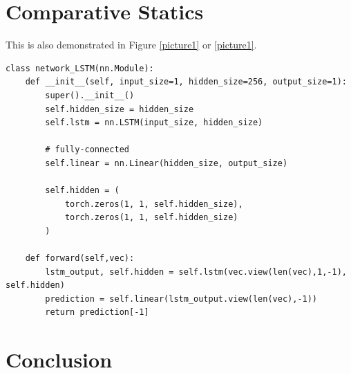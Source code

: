 \section{Comparative Statics}
This is also demonstrated in Figure \ref{picture1} or \cref{picture1}.

\begin{lstlisting}[style=python_code, caption={Long short-term memory}, label=mypythoncode]
class network_LSTM(nn.Module):
    def __init__(self, input_size=1, hidden_size=256, output_size=1):
        super().__init__()
        self.hidden_size = hidden_size
        self.lstm = nn.LSTM(input_size, hidden_size)

        # fully-connected
        self.linear = nn.Linear(hidden_size, output_size)

        self.hidden = (
            torch.zeros(1, 1, self.hidden_size),
            torch.zeros(1, 1, self.hidden_size)
        )

    def forward(self,vec):
        lstm_output, self.hidden = self.lstm(vec.view(len(vec),1,-1), self.hidden)
        prediction = self.linear(lstm_output.view(len(vec),-1))
        return prediction[-1]
\end{lstlisting}

\section{Conclusion}
\lipsum[7-9]